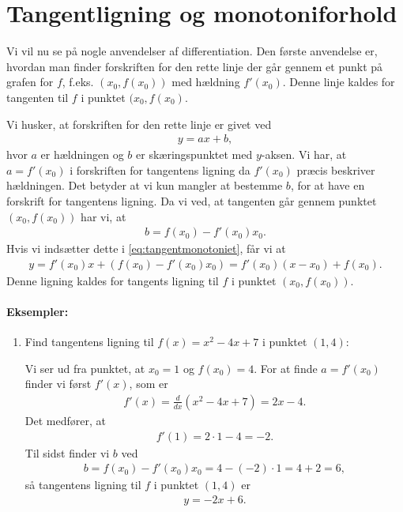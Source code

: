 \section{Tangentligning og monotoniforhold}
\noindent Vi vil nu se på nogle anvendelser af differentiation. Den første anvendelse er, hvordan man finder forskriften for den rette linje der går gennem et punkt på grafen for $f$, f.eks. $(x_0,f(x_0))$ med hældning $f'(x_0)$. Denne linje kaldes for tangenten til $f$ i punktet $(x_0,f(x_0)$.

Vi husker, at forskriften for den rette linje er givet ved
\begin{align}\label{eq:tangentmonotoniet}
y=ax+b,
\end{align}
hvor $a$ er hældningen og $b$ er skæringspunktet med $y$-aksen. Vi har, at $a=f'(x_0)$ i forskriften for tangentens ligning da $f'(x_0)$ præcis beskriver hældningen. Det betyder at vi kun mangler at bestemme $b$, for at have en forskrift for tangentens ligning. Da vi ved, at tangenten går gennem punktet $(x_0,f(x_0))$ har vi, at
\begin{align*}
b=f(x_0) - f'(x_0)x_0.
\end{align*}
Hvis vi indsætter dette i \eqref{eq:tangentmonotoniet}, får vi at
\begin{align*}
y=f'(x_0)x + (f(x_0)-f'(x_0)x_0) = f'(x_0)(x-x_0)+f(x_0). 
\end{align*}
Denne ligning kaldes for tangents ligning til $f$ i punktet $(x_0,f(x_0))$.

\paragraph*{Eksempler:}
\begin{enumerate}
\item Find tangentens ligning til $f(x)=x^2-4x+7$ i punktet $(1,4)$:

Vi ser ud fra punktet, at $x_0=1$ og $f(x_0)=4$. For at finde $a=f'(x_0)$ finder vi først $f'(x)$, som er
\begin{align*}
f'(x)=\frac{d}{dx}(x^2-4x+7) = 2x-4.
\end{align*}
Det medfører, at 
\begin{align*}
f'(1)=2 \cdot 1 - 4 = -2.
\end{align*}
Til sidst finder vi $b$ ved
\begin{align*}
b=f(x_0)-f'(x_0)x_0 = 4-(-2)\cdot 1 = 4+2=6,
\end{align*}
så tangentens ligning til $f$ i punktet $(1,4)$ er
\begin{align*}
y=-2x+6.
\end{align*}
\end{enumerate}

